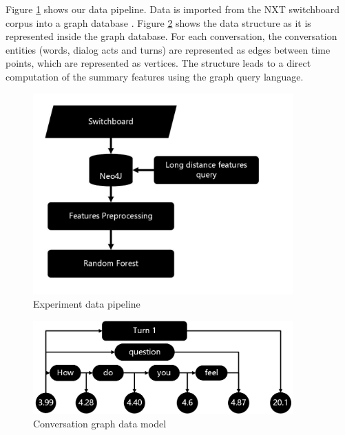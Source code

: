     Figure \ref{pipeline} shows our data pipeline. Data is imported from the NXT switchboard corpus \cite{calhoun2010nxt} into a graph database \cite{Webber:2012:PIN:2384716.2384777}.
   Figure \ref{datastructure} shows the data structure as it is represented inside the graph database. For each conversation, the conversation entities (words, dialog acts and turns) are represented as edges between time points, which are represented as vertices. The structure leads to a direct computation of the summary features using the graph query language.
\begin{figure}[ht!]
 \centering
 \includegraphics[width=10cm,keepaspectratio]{pipeline1.pdf}
 \caption{Experiment data pipeline
 \label{pipeline}}
 \end{figure}



\begin{figure}[ht!]
\centering
\includegraphics[width=10cm,keepaspectratio]{graph5.jpg}
\caption{Conversation graph data model \label{datastructure}}
\end{figure}

